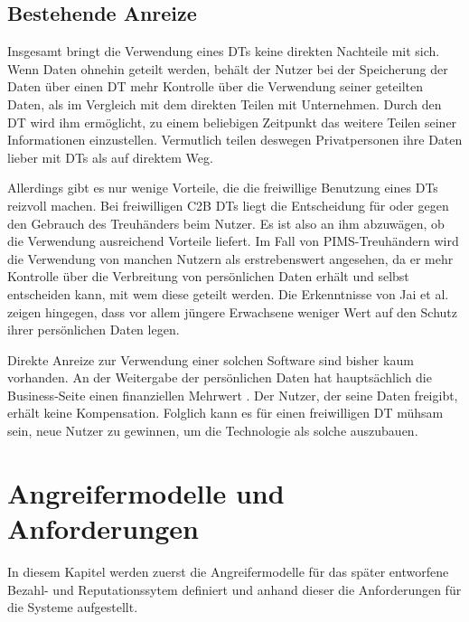 \documentclass[
	fontsize=11pt,
	headings=small,
	parskip=half,           %
	bibliography=totoc,
	numbers=noenddot,       %
	open=any,               %
]{scrreprt}
\begin{document}
\section{Bestehende Anreize}
Insgesamt bringt die Verwendung eines DTs keine direkten Nachteile mit sich. Wenn Daten ohnehin geteilt werden, behält der Nutzer bei der Speicherung der Daten über einen DT mehr Kontrolle über die Verwendung seiner geteilten Daten, als im Vergleich mit dem direkten Teilen mit Unternehmen. Durch den DT wird ihm ermöglicht, zu einem beliebigen Zeitpunkt das weitere Teilen seiner Informationen einzustellen. Vermutlich teilen deswegen Privatpersonen ihre Daten lieber mit DTs als auf direktem Weg. \cite{dt-tresor24study}

Allerdings gibt es nur wenige Vorteile, die die freiwillige Benutzung eines DTs reizvoll machen. Bei freiwilligen C2B DTs liegt die Entscheidung für oder gegen den Gebrauch des Treuhänders beim Nutzer. Es ist also an ihm abzuwägen, ob die Verwendung ausreichend Vorteile liefert. Im Fall von PIMS-Treuhändern wird die Verwendung von manchen Nutzern als erstrebenswert angesehen, da er mehr Kontrolle über die Verbreitung von persönlichen Daten erhält und selbst entscheiden kann, mit wem diese geteilt werden. Die Erkenntnisse von Jai et al. \cite{dt-jai2016privacy} zeigen hingegen, dass vor allem jüngere Erwachsene weniger Wert auf den Schutz ihrer persönlichen Daten legen.

Direkte Anreize zur Verwendung einer solchen Software sind bisher kaum vorhanden. An der Weitergabe der persönlichen Daten hat hauptsächlich die Business-Seite einen finanziellen Mehrwert \cite{dt-lipovetskajabusiness}. Der Nutzer, der seine Daten freigibt, erhält keine Kompensation. Folglich kann es für einen freiwilligen DT mühsam sein, neue Nutzer zu gewinnen, um die Technologie als solche auszubauen.




\chapter{Angreifermodelle und Anforderungen}
In diesem Kapitel werden zuerst die Angreifermodelle für das später entworfene Bezahl- und Reputationssytem definiert und anhand dieser die Anforderungen für die Systeme aufgestellt.
\label{chap:req}
\end{document}
